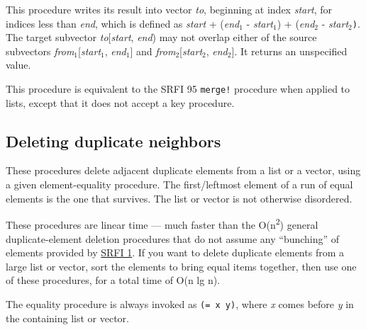 \begin{entry}{%
  }

  This procedure writes its result into vector \emph{to}, beginning at
  index \emph{start}, for indices less than \emph{end}, which is
  defined as \emph{start} + (\emph{end$_1$} - \emph{start$_1$}) +
  (\emph{end$_2$} - \emph{start$_2$}\texttt{)}. The target subvector
  \emph{to}{[}\emph{start}, \emph{end}) may not overlap either of the
  source subvectors \emph{from$_1$}{[}\emph{start$_1$},
  \emph{end$_1$}{]} and \emph{from$_2$}{[}\emph{start$_2$},
  \emph{end$_2$}{]}. It returns an unspecified value.

  This procedure is equivalent to the SRFI 95 \texttt{merge!}
  procedure when applied to lists, except that it does not accept a
  key procedure.
\end{entry}

\subsection{Deleting duplicate neighbors}

These procedures delete adjacent duplicate elements from a list or a
vector, using a given element-equality procedure. The first/leftmost
element of a run of equal elements is the one that survives. The list or
vector is not otherwise disordered.

These procedures are linear time --- much faster than the
O(n\textsuperscript{2}) general duplicate-element deletion procedures
that do not assume any ``bunching'' of elements provided by
\href{http://srfi.schemers.org/srfi-1/srfi-1.html}{SRFI 1}. If you want
to delete duplicate elements from a large list or vector, sort the
elements to bring equal items together, then use one of these
procedures, for a total time of O(n lg n).

The equality procedure is always invoked as \texttt{(=\ x\ y)}, where
\emph{x} comes before \emph{y} in the containing list or vector.

